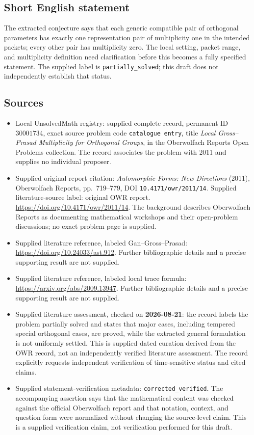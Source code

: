 \documentclass[11pt]{article}
\begin{document}
\subsection{Short English statement}
The extracted conjecture says that each generic compatible pair of orthogonal parameters has exactly one representation pair of multiplicity one in the intended packets; every other pair has multiplicity zero. The local setting, packet range, and multiplicity definition need clarification before this becomes a fully specified statement. The supplied label is \texttt{partially\_solved}; this draft does not independently establish that status.
\subsection{Sources}
\begin{itemize}
\item Local UnsolvedMath registry: supplied complete record, permanent ID \(30001734\), exact source problem code \texttt{catalogue entry}, title \emph{Local Gross--Prasad Multiplicity for Orthogonal Groups}, in the Oberwolfach Reports Open Problems collection. The record associates the problem with 2011 and supplies no individual proposer.
\item Supplied original report citation: \emph{Automorphic Forms: New Directions} (2011), Oberwolfach Reports, pp.~719--779, DOI \texttt{10.4171/owr/2011/14}. Supplied literature-source label: original OWR report. \url{https://doi.org/10.4171/owr/2011/14}. The background describes Oberwolfach Reports as documenting mathematical workshops and their open-problem discussions; no exact problem page is supplied.
\item Supplied literature reference, labeled Gan--Gross--Prasad: \url{https://doi.org/10.24033/ast.912}. Further bibliographic details and a precise supporting result are not supplied.
\item Supplied literature reference, labeled local trace formula: \url{https://arxiv.org/abs/2009.13947}. Further bibliographic details and a precise supporting result are not supplied.
\item Supplied literature assessment, checked on \textbf{2026-08-21}: the record labels the problem partially solved and states that major cases, including tempered special orthogonal cases, are proved, while the extracted general formulation is not uniformly settled. This is supplied dated curation derived from the OWR record, not an independently verified literature assessment. The record explicitly requests independent verification of time-sensitive status and cited claims.
\item Supplied statement-verification metadata: \texttt{corrected\_verified}. The accompanying assertion says that the mathematical content was checked against the official Oberwolfach report and that notation, context, and question form were normalized without changing the source-level claim. This is a supplied verification claim, not verification performed for this draft.
\end{itemize}
\end{document}
